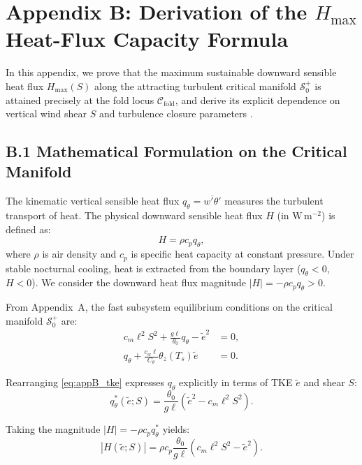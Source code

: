 \section*{Appendix B: Derivation of the $H_{\max}$ Heat-Flux Capacity Formula}
\label{app:hmax_derivation}

In this appendix, we prove that the maximum sustainable downward sensible heat flux $H_{\max}(S)$ along the attracting turbulent critical manifold $\mathcal{S}_0^+$ is attained precisely at the fold locus $\mathcal{C}_{\mathrm{fold}}$, and derive its explicit dependence on vertical wind shear $S$ and turbulence closure parameters \citep{VanDeWiel2007, VanDeWiel2012}.

\subsection*{B.1 Mathematical Formulation on the Critical Manifold}

The kinematic vertical sensible heat flux $q_\theta = \overline{w'\theta'}$ measures the turbulent transport of heat. The physical downward sensible heat flux $H$ (in $\mathrm{W\,m^{-2}}$) is defined as:
\begin{equation}
H = \rho c_p q_\theta,
\label{eq:H_def_app}
\end{equation}
where $\rho$ is air density and $c_p$ is specific heat capacity at constant pressure. Under stable nocturnal cooling, heat is extracted from the boundary layer ($q_\theta < 0$, $H < 0$). We consider the downward heat flux magnitude $|H| = -\rho c_p q_\theta > 0$.

From Appendix~A, the fast subsystem equilibrium conditions on the critical manifold $\mathcal{S}_0^+$ are:
\begin{align}
c_m \ell^2 S^2 + \frac{g \ell}{\theta_0} q_\theta - \tilde e^2 &= 0, \label{eq:appB_tke} \\[4pt]
q_\theta + \frac{c_w \ell}{C_\theta} \theta_z(T_s) \tilde e &= 0. \label{eq:appB_flux}
\end{align}

Rearranging \eqref{eq:appB_tke} expresses $q_\theta$ explicitly in terms of TKE $\tilde e$ and shear $S$:
\begin{equation}
q_\theta^*(\tilde e; S) = \frac{\theta_0}{g \ell} \left( \tilde e^2 - c_m \ell^2 S^2 \right).
\label{eq:q_theta_of_e}
\end{equation}

Taking the magnitude $|H| = -\rho c_p q_\theta^*$ yields:
\begin{equation}
|H(\tilde e; S)| = \rho c_p \frac{\theta_0}{g \ell} \left( c_m \ell^2 S^2 - \tilde e^2 \right).
\label{eq:H_mag_e}
\end{equation}

